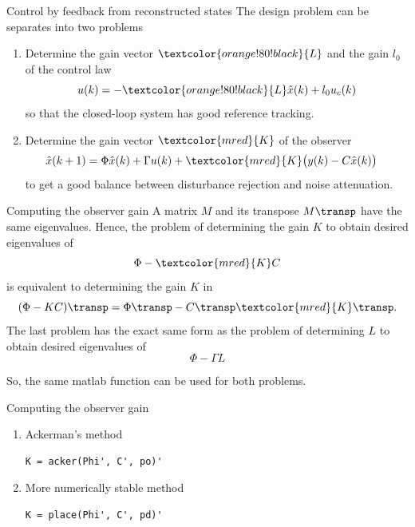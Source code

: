 \documentclass[presentation,aspectratio=1610]{beamer}
\begin{document}
\begin{frame}[label={sec:org7bf85df}]{Control by feedback from reconstructed states}
The design problem can be separates into two problems
\begin{enumerate}
\item Determine the gain vector \(\textcolor{orange!80!black}{L}\) and the gain \(l_0\) of the control law
\[ u(k) = -\textcolor{orange!80!black}{L} \hat{x}(k) + l_0 u_c(k)\]
so that the closed-loop system has good reference tracking.
\item Determine the gain vector \(\textcolor{mred}{K}\) of the observer
\begin{equation*}
\begin{split}
\hat{x}(k+1) &= \Phi \hat{x}(k) + \Gamma u(k) + \textcolor{mred}{K} \big(y(k) - C\hat{x}(k)\big)
\end{split}
\end{equation*}
to get a good balance between disturbance rejection and noise attenuation.
\end{enumerate}
\end{frame}

\begin{frame}[label={sec:org7c6078e}]{Computing the observer gain}
A matrix \(M\) and its transpose \(M\transp\) have the same eigenvalues. Hence, the problem of determining the gain \(K\) to obtain desired eigenvalues of 
\[\Phi- \textcolor{mred}{K}C\] is equivalent to determining the gain \(K\) in 
\[(\Phi-KC)\transp = \Phi\transp - C\transp \textcolor{mred}{K}\transp.\]
The last problem has the exact same form as the problem of determining \(L\) to obtain desired eigenvalues of 
\[\Phi - \Gamma L\]

So, the same matlab function can be used for both problems.
\end{frame}

\begin{frame}[label={sec:org2df0796},fragile]{Computing the observer gain}
 \begin{enumerate}
\item \alert{Ackerman's method} 
\begin{verbatim}
K = acker(Phi', C', po)'
\end{verbatim}
\item \alert{More numerically stable method} 
\begin{verbatim}
K = place(Phi', C', pd)'
\end{verbatim}
\end{enumerate}
\end{frame}
\end{document}

